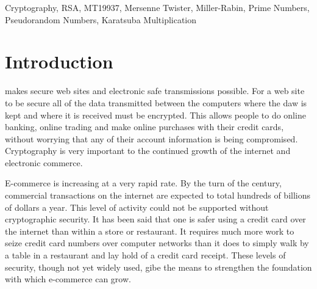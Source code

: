 \documentclass[12pt,journal,compsoc]{IEEEtran}
\begin{document}
\begin{IEEEkeywords}
Cryptography, RSA, MT19937, Mersenne Twister, Miller-Rabin, Prime Numbers, Pseudorandom Numbers, Karatsuba Multiplication
\end{IEEEkeywords}






%
\IEEEpeerreviewmaketitle



\section{{Introduction}}
% 
% 
% 
% 
 makes secure web sites and electronic safe transmissions possible. For a web site to be secure all of the data transmitted between the computers where the daw is kept and where it is received must be encrypted. This allows people to do online banking, online trading and make online purchases with their credit cards, without worrying that any of their account information is being compromised. Cryptography is very important to the continued growth of the internet and electronic commerce.

E-commerce is increasing at a very rapid rate. By the turn of the century, commercial transactions on the internet are expected to total hundreds of billions of dollars a year. This level of activity could not be supported without cryptographic security. It has been said that one is safer using a credit card over the internet than within a store or restaurant. It requires much more work to seize credit card numbers over computer networks than it does to simply walk by a table in a restaurant and lay hold of a credit card receipt. These levels of security, though not yet widely used, gibe the means to strengthen the foundation with which e-commerce can grow.
\end{document}
